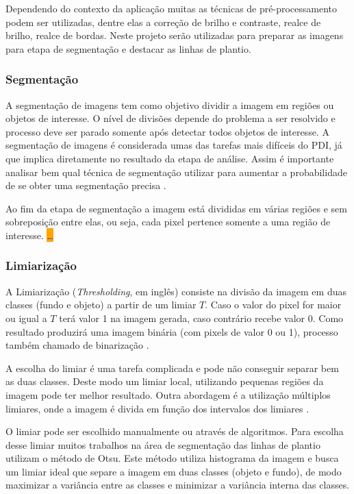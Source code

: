 \documentclass[12pt, a4paper, english, brazil]{article}
\newcommand{\dotsBlue}{\colorbox{orange}{\textcolor{blue}{\dots}}}
\begin{document}
Dependendo do contexto da aplicação muitas as técnicas de pré-processamento podem ser utilizadas, dentre elas a correção de brilho e contraste, realce de brilho, realce de bordas. Neste projeto serão utilizadas para preparar as imagens para etapa de segmentação e destacar as linhas de plantio.

\subsubsection{Segmentação}
A segmentação de imagens tem como objetivo dividir a imagem em regiões ou objetos de interesse. O nível de divisões depende do problema a ser resolvido e processo deve ser parado somente após detectar todos objetos de interesse. A segmentação de imagens é considerada umas das tarefas mais difíceis do PDI, já que implica diretamente no resultado da etapa de análise. Assim é importante analisar bem qual técnica de segmentação utilizar para aumentar a probabilidade de se obter uma segmentação precisa \cite{Gonzalez_Woods_2010}.

Ao fim da etapa de segmentação a imagem está divididas em várias regiões e sem sobreposição entre elas, ou seja, cada pixel pertence somente a uma região de interesse. \dotsBlue

\subsubsection{Limiarização}
A Limiarização (\textit{Thresholding}, em inglês) consiste na divisão da imagem em duas classes (fundo e objeto) a partir de um limiar $T$. Caso o valor do pixel for maior ou igual a $T$ terá valor 1 na imagem gerada, caso contrário recebe valor 0. Como resultado produzirá uma imagem binária (com pixels de valor 0 ou 1), processo também chamado de binarização \cite{Kuruvilla_2016}.

A escolha do limiar é uma tarefa complicada e pode não conseguir separar bem as duas classes. Deste modo um limiar local, utilizando pequenas regiões da imagem pode ter melhor resultado. Outra abordagem é a utilização múltiplos limiares, onde a imagem é divida em função dos intervalos dos limiares \cite{Gonzalez_Woods_2010}.

O limiar pode ser escolhido manualmente ou através de algoritmos. Para escolha desse limiar muitos trabalhos na área de segmentação das linhas de plantio utilizam o método de Otsu. Este método \cite{Otsu_1979} utiliza histograma da imagem e busca um limiar ideal que separe a imagem em duas classes (objeto e fundo), de modo maximizar a variância entre as classes e minimizar a variância interna das classes.
\end{document}
